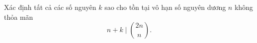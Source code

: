 \ifshowproblem
\begin{problem}\label{example:CHN-2015-MO-P4}
    Xác định tất cả các số nguyên $k$ sao cho tồn tại vô hạn số nguyên dương $n$ không thỏa mãn
    \[
        n + k \mid \binom{2n}{n}.
    \]
\end{problem}
\fi

\footnotemark
{}
\fi